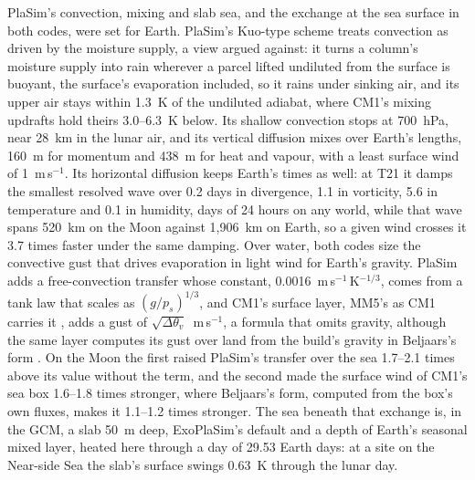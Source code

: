 PlaSim's convection, mixing and slab sea, and the exchange at the sea surface in both codes, were set for Earth.
PlaSim's Kuo-type scheme treats convection as driven by the moisture supply, a view
\textcite{emanuel1994large} argued against: it turns a column's moisture supply into rain wherever a parcel lifted
undiluted from the surface is buoyant, the surface's evaporation included, so it rains under sinking air, and its
upper air
stays within 1.3~K of the undiluted adiabat, where CM1's mixing updrafts hold theirs 3.0--6.3~K below. Its shallow
convection stops at 700~hPa, near 28~km in the lunar air, and its vertical diffusion mixes over Earth's lengths,
160~m for momentum and 438~m for heat and vapour, with a least surface wind of 1~m\,s$^{-1}$. Its
horizontal diffusion keeps Earth's times as well: at T21 it damps the smallest resolved wave over 0.2 days in
divergence, 1.1 in vorticity, 5.6 in temperature and 0.1 in humidity, days of 24 hours on any world, while that
wave spans 520~km on the Moon against 1,906~km on Earth, so a given wind crosses it 3.7 times faster under the same
damping. Over
water, both codes size the convective gust that drives evaporation in light wind for Earth's gravity. PlaSim adds a
free-convection transfer whose constant, 0.0016~m\,s$^{-1}$\,K$^{-1/3}$, comes from a tank law that scales as
$(g/p_s)^{1/3}$, and CM1's surface layer, MM5's as CM1 carries it \autocite{bryan2026cm1}, adds a gust of
$\sqrt{\Delta\theta_v}$~m\,s$^{-1}$, a formula that omits gravity, although the same layer computes its gust over
land from the build's gravity in Beljaars's form \autocite{beljaars1995parametrization}. On the Moon the first raised
PlaSim's transfer over the sea 1.7--2.1 times above its value without the term, and the second made the surface wind of CM1's sea box 1.6--1.8 times stronger,
where Beljaars's form, computed from the box's own fluxes, makes it 1.1--1.2 times stronger. The sea
beneath that exchange is, in the GCM, a slab 50~m deep, ExoPlaSim's default and a depth of Earth's seasonal mixed
layer, heated here through a day of 29.53 Earth days: at a site on the Near-side Sea the slab's surface swings 0.63~K through
the lunar day.

